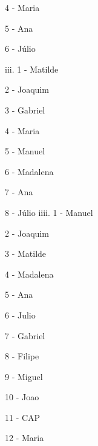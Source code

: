 \documentclass[11pt]{article}
\begin{document}
\hspace{1,5cm}4 - Maria

\hspace{1,5cm}5 - Ana

\hspace{1,5cm}6 - Júlio
\newline

\hspace{1cm}iii. 1 - Matilde

\hspace{1,6cm}2 - Joaquim

\hspace{1,6cm}3 - Gabriel

\hspace{1,6cm}4 - Maria

\hspace{1,6cm}5 - Manuel

\hspace{1,6cm}6 - Madalena

\hspace{1,6cm}7 - Ana

\hspace{1,6cm}8 - Júlio
\newpage
\hspace{1cm}iiii. 1 - Manuel

\hspace{1,7cm}2 - Joaquim

\hspace{1,7cm}3 - Matilde

\hspace{1,7cm}4 - Madalena

\hspace{1,7cm}5 - Ana

\hspace{1,7cm}6 - Julio

\hspace{1,7cm}7 - Gabriel

\hspace{1,7cm}8 - Filipe

\hspace{1,7cm}9 - Miguel

\hspace{1,7cm}10 - Joao

\hspace{1,7cm}11 - CAP

\hspace{1,7cm}12 - Maria

\end{document}
